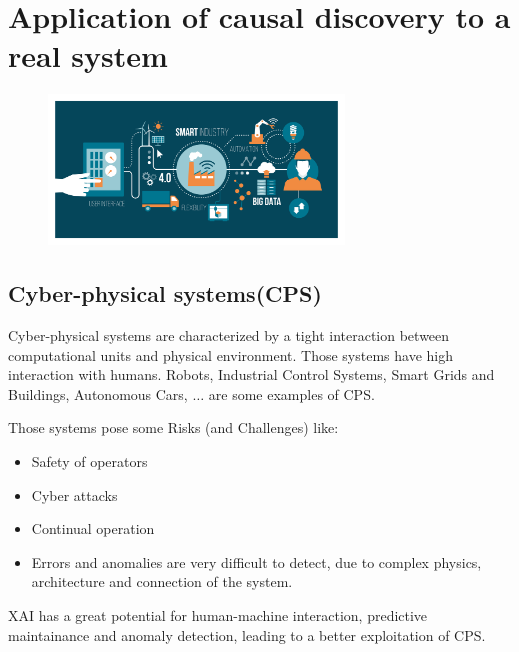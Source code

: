 \section{Application of causal discovery to a real system}
\begin{figure}[H]
    \includegraphics[width=0.7\textwidth]{img/industry4.jpg}
    \centering
\end{figure}
\subsection{Cyber-physical systems(CPS)}
Cyber-physical systems are characterized by a tight interaction between
computational units and physical environment. Those systems have high interaction with humans.
Robots, Industrial Control Systems, Smart Grids and Buildings, Autonomous Cars, $\ldots$ are some examples of CPS.

Those systems pose some Risks (and Challenges) like:
\begin{itemize}
    \item Safety of operators
    \item Cyber attacks
    \item Continual operation
    \item Errors and anomalies are very difficult to detect, due to
    complex physics, architecture and connection of the system.
\end{itemize}

XAI has a great potential for human-machine interaction, predictive maintainance and anomaly
detection, leading to a better exploitation of CPS.

